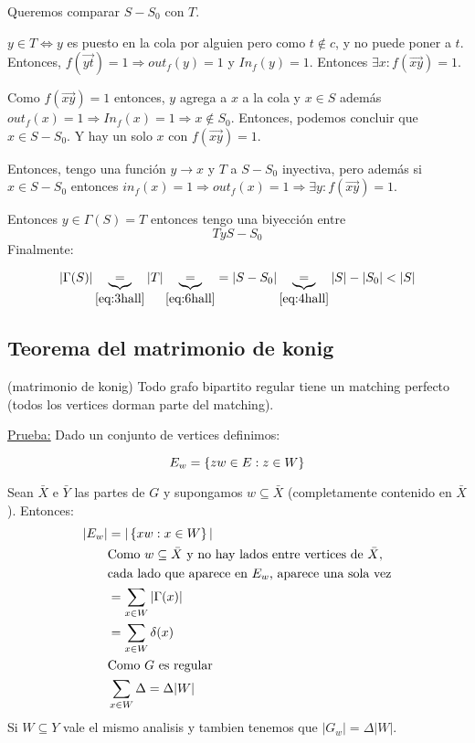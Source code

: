 \documentclass[12pt,a4paper]{article}
\begin{document}
Queremos comparar $S - S_{0}$ con $T$.
\medskip

$y\in T \Leftrightarrow y$ es puesto en la cola por alguien pero como $t\notin c$, 
y no puede poner a $t$. Entonces, $f(\overrightarrow{yt})=1 \Rightarrow out_{f}(y)=1$ 
y $In_{f}(y)=1$. Entonces $\exists x: f(\overrightarrow{xy})=1$.
\medskip

Como $f(\overrightarrow{xy})=1$ entonces, $y$ agrega a $x$ a la cola y $x\in S$ además 
$out_{f}(x) =1 \Rightarrow In_{f}(x)=1 \Rightarrow x \notin S_{0}$. Entonces, podemos 
concluir que $x\in S-S_{0}$. Y hay un solo $x$ con $f(\overrightarrow{xy})=1$.
\medskip

Entonces, tengo una función $y\to x$ y $T$ a $S-S_{0}$ inyectiva, pero además 
si $x\in S-S_{0}$ entonces $in_{f}(x)=1 \Rightarrow out_{f}(x)=1 \Rightarrow \exists y: f(\overrightarrow{xy})=1$.
\medskip

Entonces $y\in \Gamma(S) = T$ entonces tengo una biyección entre 
\begin{equation}
    T y S-S_{0}
    \label{eq:6hall}
\end{equation}
Finalmente:

\begin{equation}
    |\Gamma(S)| \underbrace{=}_{\ref{eq:3hall}} |T| \underbrace{=}_{\ref{eq:6hall}} = |S-S_{0}| \underbrace{=}_{\ref{eq:4hall}} |S| - |S_{0}| < |S|
\end{equation}

\subsection{Teorema del matrimonio de konig}
\begin{teorema} (matrimonio de konig) Todo grafo bipartito regular tiene un matching 
    perfecto (todos los vertices dorman parte del matching).
\end{teorema}

\underline{Prueba:} Dado un conjunto de vertices definimos:

$$E_{w} = \left\lbrace zw\in E: z\in W \right\rbrace$$

Sean $\bar{X}$ e $\bar{Y}$ las partes de $G$ y supongamos $w \subseteq \bar{X}$ 
(completamente contenido en $\bar{X}$). Entonces:
\begin{align*}
    |E_{w}| &= |\left\lbrace xw: x\in W \right\rbrace| \\
    &\text{Como $w \subseteq \bar{X}$ y no hay lados entre vertices de $\bar{X}$},\\ 
    &\text{cada lado que aparece en $E_{w}$, aparece una sola vez} \\
    &=\sum_{x\in W} |\Gamma(x)|\\
    &=\sum_{x\in W} \delta(x)\\
    &\text{Como $G$ es regular}\\
    &\sum_{x\in W} \Delta = \Delta |W|
\end{align*}
Si $W \subseteq Y$ vale el mismo analisis y tambien tenemos que $|G_{w}| = \Delta |W|$.
\medskip
\end{document}
